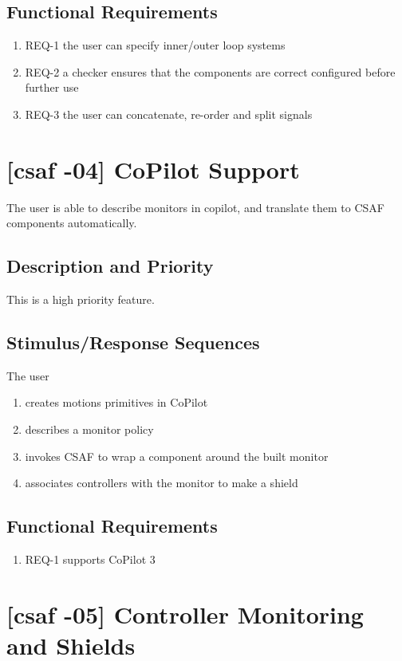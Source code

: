 \subsection{Functional Requirements}
\begin{enumerate}
\item REQ-1 \quad the user can specify inner/outer loop systems
\item REQ-2 \quad a checker ensures that the components are correct configured before further use
\item REQ-3 \quad the user can concatenate, re-order and split signals
\end{enumerate}

\section{[\acrshort{csaf} -04] CoPilot Support}
The user is able to describe monitors in copilot, and translate them to CSAF components automatically.

\subsection{Description and Priority}
This is a high priority feature.

\subsection{Stimulus/Response Sequences}
The user
\begin{enumerate}
\item creates motions primitives in CoPilot
\item describes a monitor policy 
\item  invokes CSAF to wrap a component around the built monitor
\item associates controllers with the monitor to make a shield
\end{enumerate}

\subsection{Functional Requirements}
\begin{enumerate}
\item REQ-1 \quad supports CoPilot 3
\end{enumerate}

\section{[\acrshort{csaf} -05] Controller Monitoring and Shields}


